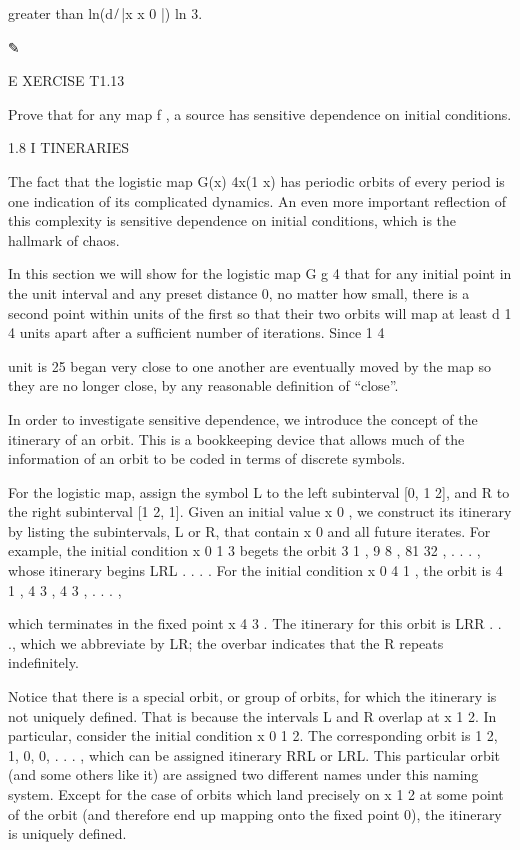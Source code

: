 \documentclass[12pt]{article}
\begin{document}
greater than ln(d ̸ |x  x 0 |)  ln 3.

✎

E XERCISE T1.13

Prove that for any map f , a source has sensitive dependence on initial conditions.

1.8 I TINERARIES

The fact that the logistic map G(x)  4x(1  x) has periodic orbits of every period is one indication of its 
complicated dynamics. An even more important reﬂection of this complexity is sensitive dependence on 
initial conditions, which is the hallmark of chaos.

In this section we will show for the logistic map G  g 4 that for any initial point in the unit interval 
and any preset distance  
 0, no matter how small, there is a second point within  units of the ﬁrst so that their two orbits will 
map at least d  1  4 units apart after a sufﬁcient number of iterations. Since 1  4

unit is 25%
began very close to one another are eventually moved by the map so they are no longer close, by any 
reasonable deﬁnition of “close”.

In order to investigate sensitive dependence, we introduce the concept of the itinerary of an orbit. This 
is a bookkeeping device that allows much of the information of an orbit to be coded in terms of discrete 
symbols.

For the logistic map, assign the symbol L to the left subinterval [0, 1  2], and R to the right subinterval 
[1  2, 1]. Given an initial value x 0 , we construct its itinerary by listing the subintervals, L or R, 
that contain x 0 and all future iterates. For example, the initial condition x 0  1  3 begets the orbit 3 1 
, 9 8 , 81 32 , . . .  , whose itinerary begins LRL . . . . For the initial condition x 0  4 1 , the orbit 
is 4 1 , 4 3 , 4 3 , . . .  ,

which terminates in the ﬁxed point x  4 3 . The itinerary for this orbit is LRR . . ., which we abbreviate 
by LR; the overbar indicates that the R repeats indeﬁnitely.

Notice that there is a special orbit, or group of orbits, for which the itinerary is not uniquely deﬁned. 
That is because the intervals L and R overlap at x  1  2. In particular, consider the initial condition x 0  
1  2. The corresponding orbit is 1  2, 1, 0, 0, . . .  , which can be assigned itinerary RRL or LRL. This 
particular orbit (and some others like it) are assigned two different names under this naming system. 
Except for the case of orbits which land precisely on x  1  2 at some point of the orbit (and therefore end 
up mapping onto the ﬁxed point 0), the itinerary is uniquely deﬁned.
\end{document}
